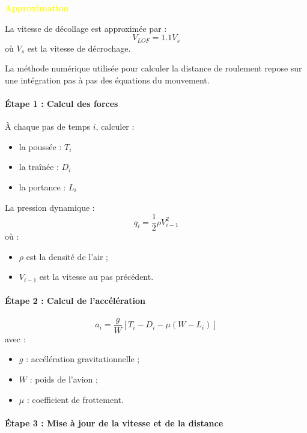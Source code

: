 		\vspace{0.3cm}
		
		\textbf{\textcolor{yellow}{Approximation}}
		
		La vitesse de décollage est approximée par :	\[	V_{LOF}=1.1V_s	\]	où $V_s$ est la vitesse de décrochage.
		
		\vspace{0.3cm}
		

		
		La méthode numérique utilisée pour calculer la distance de roulement repose sur une intégration pas à pas des équations du mouvement.
		
		\paragraph{Étape 1 : Calcul des forces}
		
		À chaque pas de temps $i$, calculer :
		
		\begin{itemize}
			\item la poussée : $T_i$
			\item la traînée : $D_i$
			\item la portance : $L_i$
		\end{itemize}
		
		La pression dynamique :		\[ q_i=\frac{1}{2}\rho V_{i-1}^2 \] où :
		
		\begin{itemize}
			\item $\rho$ est la densité de l’air ;
			\item $V_{i-1}$ est la vitesse au pas précédent.
		\end{itemize}
		
		\paragraph{Étape 2 : Calcul de l’accélération}
		
		\[ a_i= \frac{g}{W}	\left[	T_i-D_i-\mu(W-L_i)	\right]	\] 	avec :		
		\begin{itemize}
			\item $g$ : accélération gravitationnelle ;
			\item $W$ : poids de l’avion ;
			\item $\mu$ : coefficient de frottement.
		\end{itemize}
		
		\paragraph{Étape 3 : Mise à jour de la vitesse et de la distance}
		
